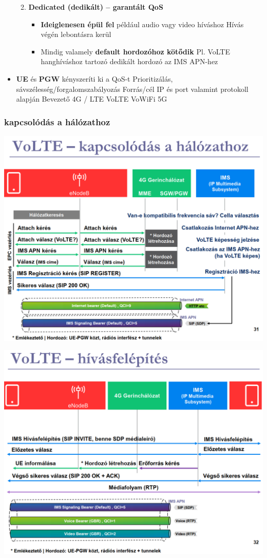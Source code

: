\documentclass[10pt,a4paper]{article}
\begin{document}
\begin{itemize}
\begin{enumerate}
\begin{itemize}
	\end{itemize}
	\item  \textbf{Dedicated (dedikált) – garantált QoS}
	\begin{itemize}
		\item  \textbf{Ideiglenesen épül fel} például audio vagy video híváshoz
	\subitem Hívás végén lebontásra kerül
	\item Mindig valamely \textbf{default hordozóhoz kötődik}
	\subitem Pl. VoLTE hanghíváshoz tartozó dedikált hordozó az IMS APN-hez
	\end{itemize}
\end{enumerate}
\item \textbf{UE} és \textbf{PGW} kényszeríti ki a QoS-t
\subitem Prioritizálás, sávszélesség/forgalomszabályozás
\subitem Forrás/cél IP és port valamint protokoll alapján
Bevezető 4G / LTE VoLTE VoWiFi 5G
	\end{itemize}
\subsubsection{kapcsolódás a hálózathoz}
\begin{center}
	\includegraphics[width=0.65\linewidth]{src/VoLTEkapcsolodas}
\end{center}
\begin{center}
	\includegraphics[width=0.65\linewidth]{src/VoLTEkapcsolodas2}
\end{center}
\end{document}
